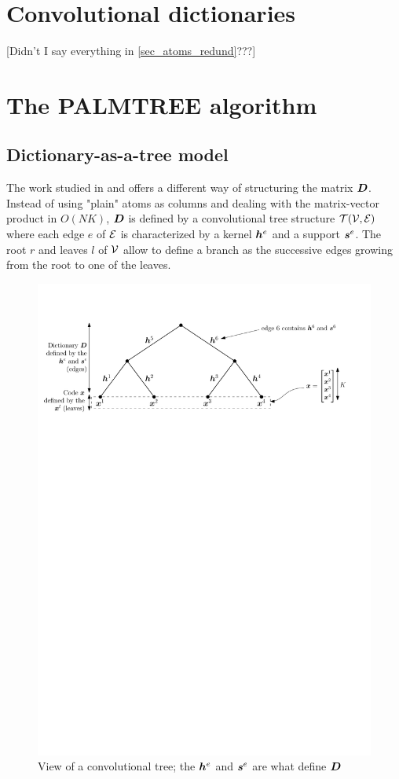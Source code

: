 \section{Convolutional dictionaries}
[Didn't I say everything in \cref{sec_atoms_redund}???]

\section{The PALMTREE algorithm}

\subsection{Dictionary-as-a-tree model \label{sec_tree_model}}
The work studied in \cite{chabiron_toward_2015} and \cite{chabiron_optimization_2016} offers a different way of structuring the matrix $\bm{D}$. Instead of using "plain" atoms as columns and dealing with the matrix-vector product in $O(NK)$, $\bm{D}$ is defined by a convolutional tree structure $\mathcal T(\mathcal V,\mathcal E)$ where each edge $e$ of $\mathcal E$ is characterized by a kernel $\bm{h}^e$ and a support $\bm{s}^e$. The root $r$ and leaves $l$ of $\mathcal V$ allow to define a branch as the successive edges growing from the root to one of the leaves.

\begin{figure}[!ht]\centering
\includegraphics[width=\textwidth]{figures/tree.pdf}
\caption{View of a convolutional tree; the $\bm{h}^e$ and $\bm{s}^e$ are what define $\bm{D}$}\label{fig_tree}
\end{figure}

